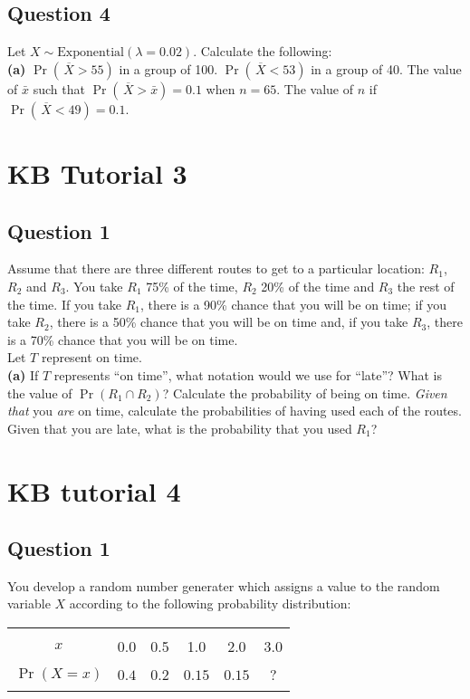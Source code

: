 \documentclass[]{article}
\begin{document}
\subsection*{Question 4}
Let $X \sim \text{Exponential}(\lambda=0.02)$. Calculate the following:\\[-0.2cm]

{\bf(a)} $\Pr(\,\overline{\!X} > 55)$ in a group of 100.  $\Pr(\,\overline{\!X} < 53)$ in a group of 40.  The value of $\bar x$ such that $\Pr(\,\overline{\!X} > \bar x) = 0.1$ when $n=65$.  The value of $n$ if $\Pr(\,\overline{\!X} < 49) = 0.1$.



\section{KB Tutorial 3}
\subsection*{Question 1}
Assume that there are three different routes to get to a particular location: $R_1$, $R_2$ and $R_3$. You take $R_1$ 75\% of the time, $R_2$ 20\% of the time and $R_3$ the rest of the time. If you take $R_1$, there is a 90\% chance that you will be on time; if you take $R_2$, there is a 50\% chance that you will be on time and, if you take $R_3$, there is a 70\% chance that you will be on time. \\[0.1cm]
Let $T$ represent on time.\\[-0.2cm]

{\bf(a)} If $T$ represents ``on time'', what notation would we use for ``late''?  What is the value of $\Pr(R_1 \cap R_2)$?  Calculate the probability of being on time.  \emph{Given that} you \emph{are} on time, calculate the probabilities of having used each of the routes.  Given that you are late, what is the probability that you used $R_1$?






\section{KB tutorial 4}

\subsection*{Question 1}
You develop a random number generater which assigns a value to the random variable $X$ according to the following probability distribution:
\begin{center}
	\begin{tabular}{|c|ccccc|}
		\hline
		&&&&&\\[-0.4cm]
		$x$ & 0.0 & 0.5 & 1.0 & 2.0 & 3.0 \\
		\hline
		&&&&&\\[-0.4cm]
		$\Pr(X=x)$ & $0.4$ & $0.2$ & $0.15$ & $0.15$ & $?$ \\[0.1cm]
		\hline
		\multicolumn{6}{c}{}\\
	\end{tabular}
\end{center}
\end{document}
